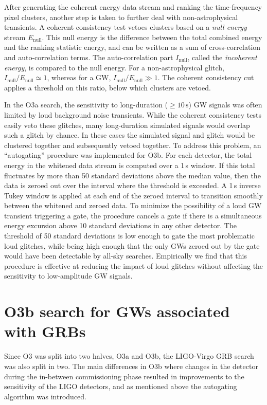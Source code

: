 After generating the coherent energy data stream and ranking the time-frequency pixel clusters, another step is taken to further deal with non-astrophysical transients.
A coherent consistency test vetoes clusters based on a \textit{null energy} stream $E_{\mathrm{null}}$.
This null energy is the difference between the total combined energy and the ranking statistic energy, and can be written as a sum of cross-correlation and auto-correlation terms.
The auto-correlation part $I_{\mathrm{null}}$, called the \textit{incoherent energy}, is compared to the null energy.
For a non-astrophysical glitch, $I_{\mathrm{null}} / E_{\mathrm{null}} \simeq 1$, whereas for a GW, $I_{\mathrm{null}} / E_{\mathrm{null}} \gg 1$.
The coherent consistency cut applies a threshold on this ratio, below which clusters are vetoed.

In the O3a search, the sensitivity to long-duration ($\geq 10\,\text{s}$) GW signals was often limited by loud background noise transients.
While the coherent consistency tests easily veto these glitches, many long-duration simulated signals would overlap such a glitch by chance.
In these cases the simulated signal and glitch would be clustered together and subsequently vetoed together.
To address this problem, an ``autogating'' procedure was implemented for O3b. For each detector, the total energy in the whitened data stream is computed over a 1\,s window.
If this total fluctuates by more than 50 standard deviations above the median value, then the data is zeroed out over the interval where the threshold is exceeded.
A 1\,s inverse Tukey window is applied at each end of the zeroed interval to transition smoothly between the whitened and zeroed data.
To minimize the possibility of a loud GW transient triggering a gate, the procedure cancels a gate if there is a simultaneous energy excursion above 10 standard deviations in any other detector.
The threshold of 50 standard deviations is low enough to gate the most problematic loud glitches, while being high enough that the only GWs zeroed out by the gate would have been detectable by all-sky searches.
Empirically we find that this procedure is effective at reducing the impact of loud glitches without affecting the sensitivity to low-amplitude GW signals.


\section{O3b search for GWs associated with GRBs}\label{sec:grb-o3b}

Since \ac{O3} was split into two halves, O3a and O3b, the \ac{LIGO}-Virgo \ac{GRB} search was also split in two.
The main differences in O3b where changes in the detector during the in-between commissioning phase resulted in improvements to the sensitivity of the LIGO detectors, and as mentioned above the autogating algorithm was introduced.

